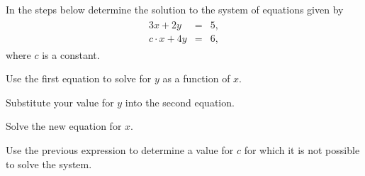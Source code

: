 \begin{problem}
\item In the steps below determine the solution to the system of equations given by
\begin{eqnarray*}
  \begin{array}{lcl}
    3x + 2y & = & 5, \\
    c \cdot x + 4y & = & 6,
  \end{array}
\end{eqnarray*}
where $c$ is a constant.
\begin{subproblem}
  \item Use the first equation to solve for $y$ as a function of $x$.
    \vfill
  \item Substitute your value for $y$ into the second equation.
    \vfill
  \item Solve the new equation for $x$.
    \vfill
  \item Use the previous expression to determine a value for $c$ for which it is not possible to solve the system.
    \vfill
\end{subproblem}
\end{problem}


